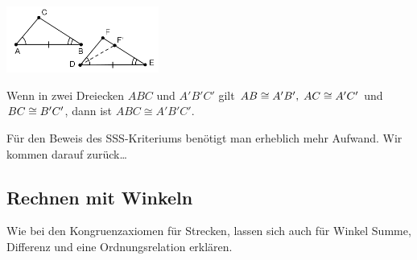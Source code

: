 \centerline{\includegraphics[width=5cm]{BILDER/1-2-11-WSW.png}}

\begin{thm}\label{thm:satz.s1n}
    Wenn in zwei Dreiecken $ABC$ und $A'B'C'$ gilt ${AB} \cong {A'B'},\; {AC} \cong
    {A'C'}$ und ${BC} \cong {B'C'}$, dann ist $ABC \cong A'B'C'$.
\end{thm}

Für den Beweis des SSS-Kriteriums benötigt man erheblich mehr Aufwand. Wir kommen darauf zurück\dots

\subsection*{Rechnen mit Winkeln}

Wie bei den Kongruenzaxiomen für Strecken, lassen sich auch für Winkel Summe, Differenz und eine
Ordnungsrelation erklären.

